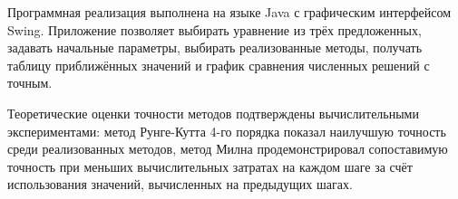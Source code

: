 Программная реализация выполнена на языке Java с графическим интерфейсом Swing. Приложение позволяет выбирать уравнение из трёх предложенных, задавать начальные параметры, выбирать реализованные методы, получать таблицу приближённых значений и график сравнения численных решений с точным.

Теоретические оценки точности методов подтверждены вычислительными экспериментами: метод Рунге-Кутта 4-го порядка показал наилучшую точность среди реализованных методов, метод Милна продемонстрировал сопоставимую точность при меньших вычислительных затратах на каждом шаге за счёт использования значений, вычисленных на предыдущих шагах.

